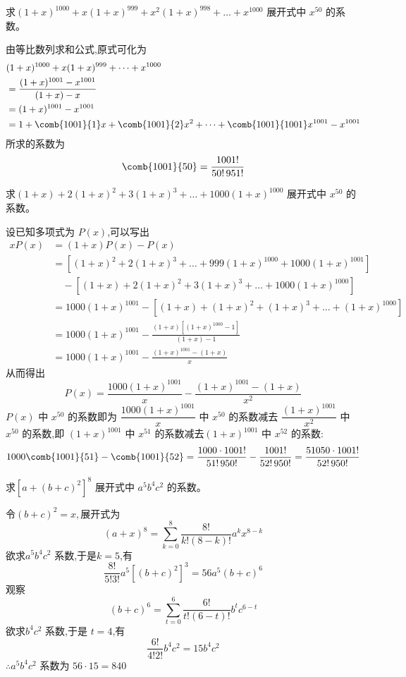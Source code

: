 \begin{questions}
    \question 求$(1+x)^{1000} + x(1+x)^{999} + x^2(1+x)^{998} + \dots + x^{1000}$ 展开式中 $x^{50}$ 的系数。
    \begin{solution}
        由等比数列求和公式,原式可化为
        \begin{align*}
        &(1+x)^{1000} + x(1+x)^{999} + \dots + x^{1000} \\
        &= \frac{(1+x)^{1001} - x^{1001}}{(1+x) - x} \\
        &= (1+x)^{1001} - x^{1001} \\
        &= 1 + \comb{1001}{1}x + \comb{1001}{2}x^2 + \dots + \comb{1001}{1001}x^{1001} - x^{1001}
        \end{align*}
        所求的系数为
        \[ 
        \comb{1001}{50} = \frac{1001!}{50!\,951!} 
        \]
    \end{solution}

    \question 求$(1+x) + 2(1+x)^2 + 3(1+x)^3 + \dots + 1000(1+x)^{1000}$ 展开式中 $x^{50}$ 的系数。
    \begin{solution}
        设已知多项式为 $P(x)$,可以写出
        \begin{align*}
        x P(x) &= (1+x)P(x) - P(x) \\
        &= \left[(1+x)^2 + 2(1+x)^3 + \dots + 999(1+x)^{1000} + 1000(1+x)^{1001}\right] \\
        &\quad - \left[(1+x) + 2(1+x)^2 + 3(1+x)^3 + \dots + 1000(1+x)^{1000}\right] \\
        &= 1000(1+x)^{1001} - \left[(1+x) + (1+x)^2 + (1+x)^3 + \dots + (1+x)^{1000}\right] \\
        &= 1000(1+x)^{1001} - \frac{(1+x)[(1+x)^{1000} - 1]}{(1+x) - 1} \\
        &= 1000(1+x)^{1001} - \frac{(1+x)^{1001} - (1+x)}{x}
        \end{align*}
        从而得出
        \[ 
        P(x) = \frac{1000(1+x)^{1001}}{x} - \frac{(1+x)^{1001} - (1+x)}{x^2} 
        \]
        $P(x)$ 中 $x^{50}$ 的系数即为 $\dfrac{1000(1+x)^{1001}}{x}$ 中 $x^{50}$ 的系数减去 $\dfrac{(1+x)^{1001}}{x^2}$ 中 $x^{50}$ 的系数,即 $(1+x)^{1001}$ 中 $x^{51}$ 的系数减去$(1+x)^{1001}$ 中 $x^{52}$ 的系数:
        \[
        1000 \comb{1001}{51} - \comb{1001}{52} = \frac{1000 \cdot 1001!}{51!\,950!} - \frac{1001!}{52!\,950!} = \frac{51050 \cdot 1001!}{52!\,950!}
        \]
    \end{solution}

    \question 求\(\left[a + (b + c)^2\right]^8\) 展开式中 \( a^5 b^4 c^2 \) 的系数。
    \begin{solution}
        令$(b+c)^2=x,$展开式为
        $$(a+x)^8 = \sum_{k=0}^{8} \frac{8!}{k!(8-k)!} a^k x^{8-k} $$
        欲求$a^5b^4c^2$ 系数,于是$k=5$,有
        $$\frac{8!}{5!3!} a^5 [(b+c)^2]^3 = 56a^5 (b+c)^6 $$
        观察
        $$(b+c)^6 = \sum_{t=0}^{6} \frac{6!}{t!(6-t)!} b^t c^{6-t}$$
        欲求$b^4c^2$ 系数,于是 $t=4$,有
        $$\frac{6!}{4!2!} b^4 c^2 = 15b^4 c^2 $$
        $\therefore a^5b^4c^2$ 系数为 $56 \cdot 15 = 840$
    \end{solution}


\end{questions}
